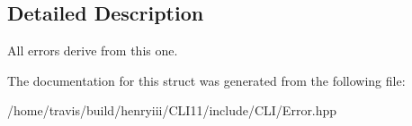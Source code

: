 \subsection{Detailed Description}
All errors derive from this one. 

The documentation for this struct was generated from the following file\+:\begin{DoxyCompactItemize}
\item 
/home/travis/build/henryiii/\+C\+L\+I11/include/\+C\+L\+I/Error.\+hpp\end{DoxyCompactItemize}
